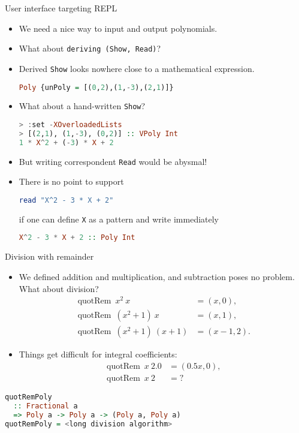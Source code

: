 \documentclass[handout]{beamer}
\DeclareMathOperator{\quotRem}{quotRem}
\begin{document}
\begin{frame}[fragile]{User interface targeting REPL}

\begin{itemize}[<+->]
\item We need a nice way to input and output polynomials.
\item What about {\tt deriving (Show, Read)}?
\item Derived {\tt Show} looks nowhere close to
      a mathematical expression.

\begin{lstlisting}[language=Haskell]
Poly {unPoly = [(0,2),(1,-3),(2,1)]}
\end{lstlisting}

\item What about a hand-written {\tt Show}?
\begin{lstlisting}[language=Haskell]
> :set -XOverloadedLists
> [(2,1), (1,-3), (0,2)] :: VPoly Int
1 * X^2 + (-3) * X + 2
\end{lstlisting}
\item But writing correspondent {\tt Read} would be abysmal!
\item There is no point to support
\begin{lstlisting}[language=Haskell]
read "X^2 - 3 * X + 2"
\end{lstlisting}
if one can define {\tt X} as a pattern and write immediately
\begin{lstlisting}[language=Haskell]
X^2 - 3 * X + 2 :: Poly Int
\end{lstlisting}
\end{itemize}

\end{frame}

\begin{frame}[fragile]{Division with remainder}

\begin{itemize}[<+->]
\item We defined addition and multiplication, and
      subtraction poses no problem. What about division?
\begin{align*}
\quotRem~x^2~x &= (x, 0), \\
\quotRem~(x^2+1)~x &= (x, 1), \\
\quotRem~(x^2+1)~(x+1) &= (x-1, 2).
\end{align*}

\item Things get difficult for integral coefficients:
\begin{align*}
\quotRem~x~2.0 &= (0.5x, 0), \\
\quotRem~x~2\phantom{.0} &={} ?
\end{align*}

\end{itemize}

\pause

\begin{lstlisting}[language=Haskell]
quotRemPoly
  :: Fractional a
  => Poly a -> Poly a -> (Poly a, Poly a)
quotRemPoly = <long division algorithm>
\end{lstlisting}

\end{frame}
\end{document}
